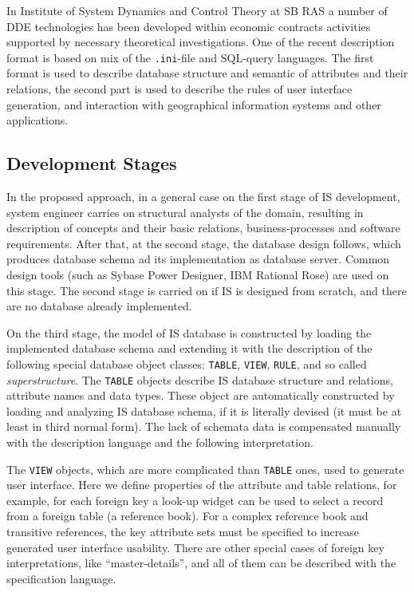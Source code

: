 \documentclass[conference]{IEEEtran}
\begin{document}
In Institute of System Dynamics and Control Theory at SB RAS a number of DDE technologies has been developed within economic contracts activities supported by necessary theoretical investigations.  One of the recent description format is based on mix of the \texttt{.ini}-file and SQL-query languages.  The first format is used to describe database structure and semantic of attributes and their relations, the second part is used to describe the rules of user interface generation, and interaction with geographical information systems and other applications.

\subsection{Development Stages}
\label{sec:descr-synth-stag}

In the proposed approach, in a general case on the first stage of IS development, system engineer carries on structural analysts of the domain, resulting in description of concepts and their basic relations, business-processes and software requirements.  After that, at the second stage, the database design follows, which produces database schema ad its implementation as database server.  Common design tools (such as Sybase Power Designer, IBM Rational Rose) are used on this stage.  The second stage is carried on if IS is designed from scratch, and there are no database already implemented.

On the third stage, the model of IS database is constructed by loading the implemented database schema and extending it with the description of the following special database object classes: \texttt{TABLE}, \texttt{VIEW}, \texttt{RULE}, and so called \emph{superstructure}.  The \texttt{TABLE} objects describe IS database structure and relations, attribute names and data types.  These object are automatically constructed by loading and analyzing IS database schema, if it is literally devised (it must be at least in third normal form).  The lack of schemata data is compensated manually with the description language and the following interpretation.

The \texttt{VIEW} objects, which are more complicated than \texttt{TABLE} ones, used to generate user interface.  Here we define properties of the attribute and table relations, for example, for each foreign key a look-up widget can be used to select a record from a foreign table (a reference book).  For a complex reference book and transitive references, the key attribute sets must be specified to increase generated user interface usability.  There are other special cases of foreign key interpretations, like ``master-details'', and all of them can be described with the specification language.
\end{document}

